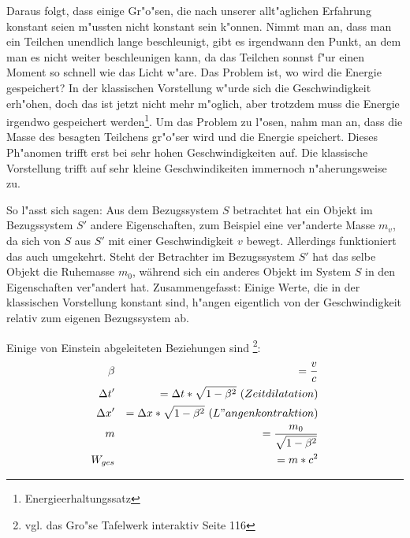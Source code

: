 \documentclass[14pt, a4paper]{report}
\begin{document}
Daraus folgt, dass einige Gr"o"sen, die nach unserer allt"aglichen Erfahrung konstant
seien m"ussten nicht konstant sein k"onnen. Nimmt man an, dass man ein Teilchen 
unendlich lange beschleunigt, gibt es irgendwann den Punkt, an dem man es nicht weiter
beschleunigen kann, da das Teilchen sonnst f"ur einen Moment so schnell wie das Licht 
w"are. Das Problem ist, wo wird die Energie gespeichert? In der klassischen Vorstellung 
w"urde sich die Geschwindigkeit erh"ohen, doch das ist jetzt nicht mehr m"oglich, aber 
trotzdem muss die Energie irgendwo gespeichert werden\footnote{Energieerhaltungssatz}. 
Um das Problem zu l"osen, nahm man an, dass die Masse des besagten Teilchens gr"o"ser 
wird und die Energie speichert. 
Dieses Ph"anomen trifft erst bei sehr hohen Geschwindigkeiten auf. Die klassische 
Vorstellung trifft auf sehr kleine Geschwindikeiten immernoch n"aherungsweise zu.

So l"asst sich sagen: Aus dem Bezugssystem $S$ betrachtet hat 
ein Objekt im Bezugssystem $S'$ andere Eigenschaften, zum Beispiel eine ver"anderte 
Masse $m_v$, da sich von $S$ aus $S'$ mit einer Geschwindigkeit $v$ bewegt. 
Allerdings funktioniert das auch umgekehrt. Steht der Betrachter im Bezugssystem $S'$ 
hat das selbe Objekt die Ruhemasse $m_0$, während sich ein anderes Objekt im System $S$ 
in den Eigenschaften ver"andert hat. Zusammengefasst: Einige Werte, die in der 
klassischen Vorstellung konstant sind, h"angen eigentlich von der Geschwindigkeit 
relativ zum eigenen Bezugssystem ab.

Einige von Einstein abgeleiteten Beziehungen sind 
\footnote{vgl. das Gro"se Tafelwerk interaktiv Seite 116 }:
\begin{eqnarray}
\beta && = \frac{v}{c} \\
\Delta t' && = \Delta t * \sqrt{1 - \beta^2} ~ (Zeitdilatation) \\
\Delta x' && = \Delta x * \sqrt{1 - \beta^2} ~ (L"angenkontraktion) \\
m && = \frac{m_0}{\sqrt{1 - \beta^2}} \label{var_m} \\
W_{ges} && = m * c^2 \label{mc_square}
\end{eqnarray}
\end{document}
